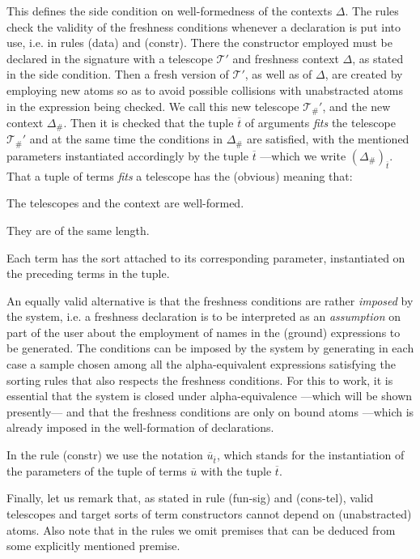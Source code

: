\documentclass[copyright,creativecommons]{eptcs}
\newcounter{s}
\newcommand{\vect}[1]{\ensuremath{\overline{#1}}}
\begin{document}
This defines the side condition on well-formedness of the contexts $\Delta$.
The rules check the validity of the freshness conditions whenever a declaration is put into use, i.e. in rules (data) and (constr). There the constructor employed must be declared in the signature with a telescope $\mathscr{T'}$ and freshness context $\Delta$, as stated in the side condition. Then a fresh version of $\mathscr{T'}$, as well as of $\Delta$, are created by employing new atoms so as to avoid possible collisions with unabstracted atoms in the expression being checked. We call this new telescope $\mathscr{T}_{\#}'$, and the new context $\Delta_{\#}$. Then it is checked that the tuple $\vect{t}$ of arguments \emph{fits} the telescope $\mathscr{T}_{\#}'$ and at the same time the conditions in $\Delta_{\#}$ are satisfied, with the mentioned parameters instantiated accordingly by the tuple $\vect{t}$ ---which we write $(\Delta_{\#})_{\vect{t}}$. 
That a tuple of terms \emph{fits} a telescope has the (obvious) meaning that:
\begin{inparaenum}[a)]
\item The telescopes and the context are well-formed.
\item They are of the same length.
\item Each term has the sort attached to its corresponding parameter, instantiated on the preceding terms in the tuple.
\end{inparaenum}

An equally valid alternative is that the freshness conditions are rather \emph{imposed} by the system, i.e. a freshness declaration is to be interpreted as an \emph{assumption} on part of the user about the employment of names in the (ground) expressions to be generated. The conditions can be imposed by the system by generating in each case a sample chosen among all the alpha-equivalent expressions satisfying the sorting rules that also respects the freshness conditions. For this to work, it is essential that the system is closed under alpha-equivalence ---which  will be shown presently--- and that the freshness conditions are only on bound atoms ---which is already imposed in the well-formation of declarations.

In the rule (constr) we use the notation $\vect{u}_{\vect{t}}$, which stands for the instantiation of the parameters of the tuple of terms $\vect{u}$ with the tuple $\vect{t}$.

Finally, let us remark that, as stated in rule (fun-sig) and (cons-tel), valid telescopes and target sorts of term constructors cannot depend on (unabstracted) atoms. Also note that in the rules we omit premises that can be deduced from some explicitly mentioned premise.
\end{document}
